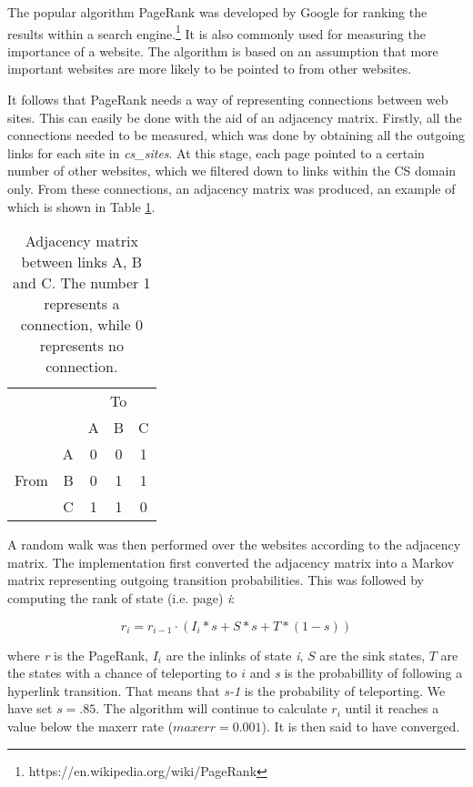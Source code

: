 The popular algorithm PageRank was developed by Google for ranking the results within a search engine.\footnote{https://en.wikipedia.org/wiki/PageRank} It is also commonly used for measuring the importance of a website. The algorithm is based on an assumption that more important websites are more likely to be pointed to from other websites.

It follows that PageRank needs a way of representing connections between web sites. This can easily be done with the aid of an adjacency matrix. Firstly, all the connections needed to be measured, which was done by obtaining all the outgoing links for each site in \emph{cs\_sites}. At this stage, each page pointed to a certain number of other websites,
which we filtered down to links within the CS domain only. From these connections, an adjacency matrix was produced, an example of which is shown in Table \ref{fig:adj_mx}. 

\begin{table}[!t]
  \centering
  \caption{Adjacency matrix between links A, B and C. The number 1 represents a connection, while 0 represents no connection.}
  \begin{tabular}{|lr|c|c|c|} \cline{3-5}
  \multicolumn{1}{l}{} && \multicolumn{3}{c|}{To} \\ \cline{3-5}
  \multicolumn{1}{l}{} & & A & B & C  \\ \hline
  \multirow{3}{*}{\begin{sideways}From\end{sideways}}
  & \multicolumn{1}{|r|}{A} & 0 & 0 & 1  \\ \cline{2-5}
  & \multicolumn{1}{|r|}{B} & 0 & 1 & 1  \\ \cline{2-5}
  & \multicolumn{1}{|r|}{C} & 1 & 1 & 0  \\ \hline
  \end{tabular}
  \label{fig:adj_mx}
\end{table}

A random walk was then performed over the websites according to the adjacency matrix. The implementation first converted the adjacency matrix into a Markov matrix representing outgoing transition probabilities. This was followed by computing the rank of state (i.e. page) \emph{i}:

$$ r_i = r_{i-1} \cdot (I_i *s + S * s + T * (1-s)) $$ 

where \emph{r} is the PageRank, \emph{$I_i$} are the inlinks of state \emph{i}, \emph{$S$} are the sink states, \emph{$T$} are the states with a chance of teleporting to $i$ and \emph{s} is the probabillity of following a hyperlink transition. That means that \emph{s-1} is the probability of teleporting. We have set $s=.85$. The algorithm will continue to calculate \emph{$r_i$} until it reaches a value below the maxerr rate ($maxerr = 0.001$). It is then said to have converged. 

